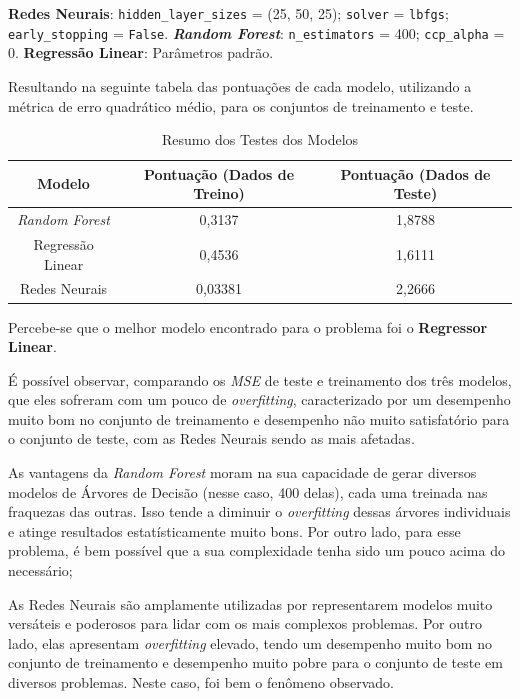 \documentclass{report}
\begin{document}
\begin{outline}
    \1\textbf{Redes Neurais}:
      \2 \texttt{hidden\_layer\_sizes} = (25, 50, 25); 
      \2 \texttt{solver} = \texttt{lbfgs};
      \2 \texttt{early\_stopping} = \texttt{False}.
    \1\textbf{\textit{Random Forest}}:
      \2 \texttt{n\_estimators} = 400;
      \2 \texttt{ccp\_alpha} = 0.
    \1 \textbf{Regressão Linear}:
      \2 Parâmetros padrão.
\end{outline}

Resultando na seguinte tabela das pontuações de cada modelo, utilizando a métrica de erro quadrático médio, para os conjuntos de treinamento e teste.

\begin{table}[h!]
  \centering
  \begin{tabular}{| c | c | c |}
      \hline
      \rowcolor{lightgray}
      \textbf{Modelo} & \textbf{Pontuação (Dados de Treino)} & \textbf{Pontuação (Dados de Teste)} \\
      \hline
      \textit{Random Forest} & 0,3137 & 1,8788 \\
      \hline
      Regressão Linear & 0,4536 & 1,6111 \\
      \hline
      Redes Neurais & 0,03381 & 2,2666 \\
      \hline
  \end{tabular}
  \caption{\label{table:test_summary} Resumo dos Testes dos Modelos}
\end{table}

Percebe-se que o melhor modelo encontrado para o problema foi o \textbf{Regressor Linear}.

É possível observar, comparando os \textit{MSE} de teste e treinamento dos três modelos, que eles sofreram com um pouco de \textit{overfitting},
caracterizado por um desempenho muito bom no conjunto de treinamento e desempenho não muito satisfatório para o conjunto de teste, com as Redes Neurais sendo as mais afetadas.

As vantagens da \textit{Random Forest} moram na sua capacidade de gerar diversos modelos de Árvores de Decisão (nesse caso, 400 delas), cada uma treinada nas fraquezas das outras.
Isso tende a diminuir o \textit{overfitting} dessas árvores individuais e atinge resultados estatísticamente muito bons. Por outro lado, para esse problema, é bem possível que a sua
complexidade tenha sido um pouco acima do necessário;

As Redes Neurais são amplamente utilizadas por representarem modelos muito versáteis e poderosos para lidar com os mais complexos problemas. Por outro lado, elas apresentam
\textit{overfitting} elevado, tendo um desempenho muito bom no conjunto de treinamento e desempenho muito pobre para o conjunto de teste em diversos problemas. Neste caso, foi bem o fenômeno
observado.
\end{document}
